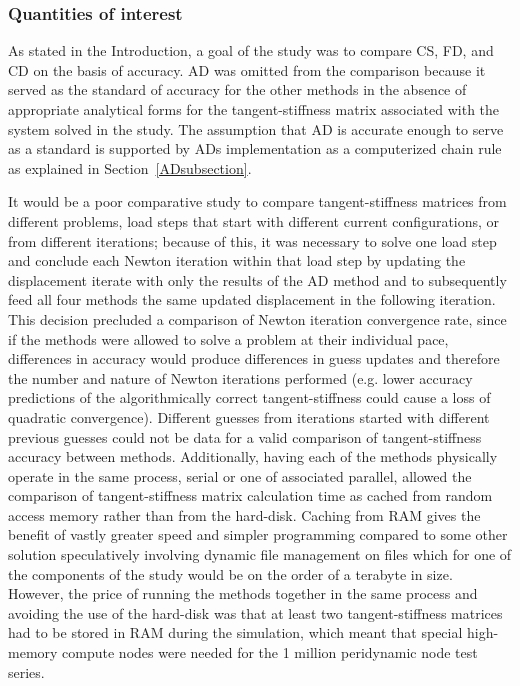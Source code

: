 \documentclass[preprint,12pt]{elsarticle}
\begin{document}
\subsubsection{Quantities of interest} 
\label{JGAM} 
As stated in the Introduction, a goal of the study was to compare CS, FD, and CD on the basis of accuracy. AD was omitted from the comparison because it served as the standard of accuracy for the other methods in the absence of appropriate analytical forms for the tangent-stiffness matrix associated with the system solved in the study. The assumption that AD is accurate enough to serve as a standard is supported by ADs implementation as a computerized chain rule as explained in Section~\ref{ADsubsection}.

It would be a poor comparative study to compare tangent-stiffness matrices from different problems, load steps that start with different current configurations, or from different iterations; because of this, it was necessary to solve one
load step and conclude each Newton iteration within that load step by updating the displacement iterate with only the results of the AD method and to subsequently feed all four methods the same updated displacement in the following iteration. This decision precluded a comparison of Newton iteration convergence rate, since if the methods were allowed to solve a problem at their individual pace, differences in accuracy would produce differences in guess updates and therefore the number and nature of Newton iterations performed (e.g. lower accuracy predictions of the algorithmically correct tangent-stiffness could cause a loss of quadratic convergence).  Different guesses from iterations started with different previous guesses could not be data for a valid comparison of tangent-stiffness accuracy between methods.  Additionally, having each of the methods physically operate in the same process, serial or one of associated parallel, allowed the comparison of tangent-stiffness matrix calculation time as cached from random access memory rather than from the hard-disk.  Caching from RAM gives the benefit of vastly greater speed and simpler programming compared to some other solution speculatively involving dynamic file management on files which for one of the components of the study would be on the order of a terabyte in size. However, the price of running the methods together in the same process and avoiding the use of the hard-disk was that at least two tangent-stiffness matrices had to be stored in RAM during the simulation, which meant that special high-memory compute nodes were needed for the 1 million peridynamic node test series.
\end{document}
